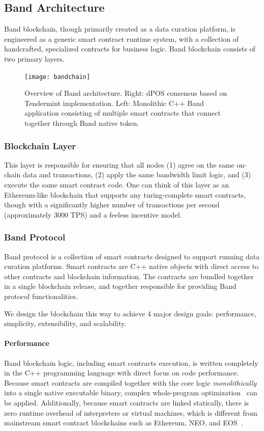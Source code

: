 \documentclass[letterpaper,11pt]{article}
\begin{document}
\newpage

\subsection{Band Architecture}
Band blockchain, though primarily created as a data curation platform, is engineered as a generic smart contract runtime system, with a collection of handcrafted, specialized contracts for business logic. Band blockchain consists of two primary layers. 

\begin{figure}[ht!]
    \centering
    \texttt{[image: bandchain]}
	\captionsetup{labelformat=empty}
    \caption{Overview of Band architecture. Right: dPOS consensus based on Tendermint implementation. Left: Monolithic C++ Band application consisting of multiple smart contracts that connect together through Band native token.}
    \label{fig:pyramid}
\end{figure}

\subsubsection{Blockchain Layer}
This layer is responsible for ensuring that all nodes (1) agree on the same on-chain data and transactions, (2) apply the same bandwidth limit logic, and (3) execute the same smart contract code. One can think of this layer as an Ethereum-like blockchain that supports any turing-complete smart contracts, though with a significantly higher number of transactions per second (approximately 3000 TPS) and a feeless incentive model.

\subsubsection{Band Protocol}

Band protocol is a collection of smart contracts designed to support running data curation platforms. Smart contracts are C++ native objects with direct access to other contracts and blockchain information.  The contracts are bundled together in a single blockchain release, and together responsible for providing Band protocol functionalities. 

We design the blockchain this way to achieve 4 major design goals: performance, simplicity, extensibility, and scalability.

\paragraph{Performance}
Band blockchain logic, including smart contracts execution, is written completely in the C++ programming language with direct focus on code performance. Because smart contracts are compiled together with the core logic \emph{monolithically} into a single native executable binary, complex whole-program optimization~\cite{chambers1996whole} can be applied. Additionally, because smart contracts are linked statically, there is zero runtime overhead of interpreters or virtual machines, which is different from mainstream smart contract blockchains such as Ethereum, NEO, and EOS~\cite{wood2014ethereum,neowhitepaper,eoswhitepaper}.
\end{document}
